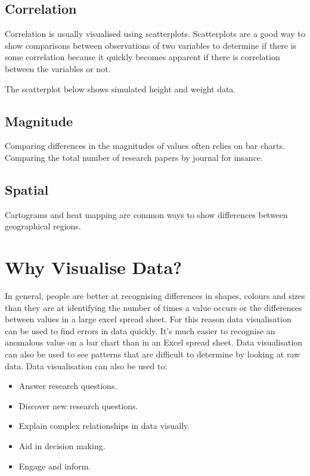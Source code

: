 \documentclass[
]{book}
\providecommand{\tightlist}{%
  \setlength{\itemsep}{0pt}\setlength{\parskip}{0pt}}
\begin{document}
\hypertarget{correlation}{%
\subsection{Correlation}\label{correlation}}

Correlation is usually visualised using scatterplots. Scatterplots are a good way to show comparisons between observations of two variables to determine if there is some correlation because it quickly becomes apparent if there is correlation between the variables or not.

The scatterplot below shows simulated height and weight data.

\hypertarget{magnitude}{%
\subsection{Magnitude}\label{magnitude}}

Comparing differences in the magnitudes of values often relies on bar charts. Comparing the total number of research papers by journal for insance.

\hypertarget{spatial}{%
\subsection{Spatial}\label{spatial}}

Cartograms and heat mapping are common ways to show differences between geographical regions.

\hypertarget{why-visualise-data}{%
\section{Why Visualise Data?}\label{why-visualise-data}}

In general, people are better at recognising differences in shapes, colours and sizes than they are at identifying the number of times a value occurs or the differences between values in a large excel spread sheet. For this reason data visualisation can be used to find errors in data quickly. It's much easier to recognise an anomalous value on a bar chart than in an Excel spread sheet. Data visualisation can also be used to see patterns that are difficult to determine by looking at raw data.
Data visualisation can also be used to:

\begin{itemize}
\tightlist
\item
  Answer research questions.
\item
  Discover new research questions.
\item
  Explain complex relationships in data visually.
\item
  Aid in decision making.
\item
  Engage and inform.
\end{itemize}
\end{document}
